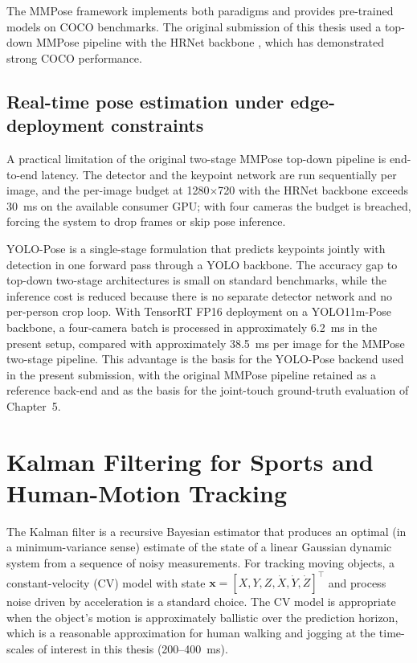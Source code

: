 The MMPose framework \cite{ref17} implements both paradigms and provides pre-trained models on COCO benchmarks. The original submission of this thesis used a top-down MMPose pipeline with the HRNet backbone \cite{ref18}, which has demonstrated strong COCO performance.

\subsection{Real-time pose estimation under edge-deployment constraints}

A practical limitation of the original two-stage MMPose top-down pipeline is end-to-end latency. The detector and the keypoint network are run sequentially per image, and the per-image budget at 1280$\times$720 with the HRNet backbone exceeds 30~ms on the available consumer GPU; with four cameras the budget is breached, forcing the system to drop frames or skip pose inference.

YOLO-Pose \cite{ref37_yolopose} is a single-stage formulation that predicts keypoints jointly with detection in one forward pass through a YOLO backbone. The accuracy gap to top-down two-stage architectures is small on standard benchmarks, while the inference cost is reduced because there is no separate detector network and no per-person crop loop. With TensorRT FP16 deployment on a YOLO11m-Pose backbone, a four-camera batch is processed in approximately 6.2~ms in the present setup, compared with approximately 38.5~ms per image for the MMPose two-stage pipeline. This advantage is the basis for the YOLO-Pose backend used in the present submission, with the original MMPose pipeline retained as a reference back-end and as the basis for the joint-touch ground-truth evaluation of Chapter~5.

\section{Kalman Filtering for Sports and Human-Motion Tracking}

The Kalman filter \cite{ref39_kalman1960, ref40_baryam_kf} is a recursive Bayesian estimator that produces an optimal (in a minimum-variance sense) estimate of the state of a linear Gaussian dynamic system from a sequence of noisy measurements. For tracking moving objects, a constant-velocity (CV) model with state $\mathbf{x} = [X, Y, Z, \dot{X}, \dot{Y}, \dot{Z}]^\top$ and process noise driven by acceleration is a standard choice. The CV model is appropriate when the object's motion is approximately ballistic over the prediction horizon, which is a reasonable approximation for human walking and jogging at the time-scales of interest in this thesis (200--400~ms).

